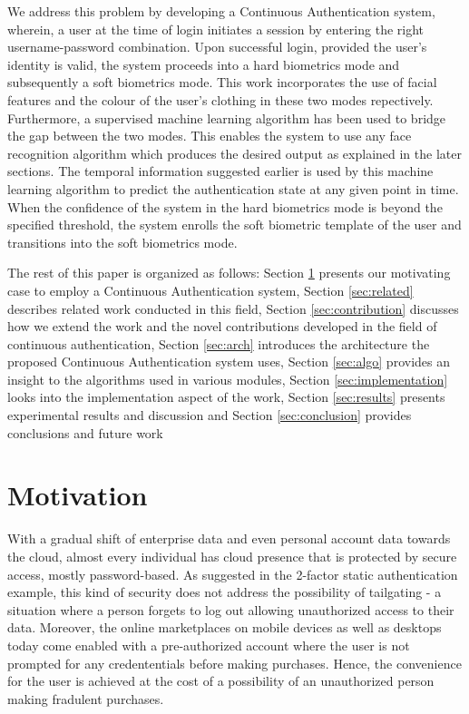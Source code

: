 \documentclass[%
        final,
        internal,
        notitlepage,
        narroweqnarray,
        inline,
        ]{ieee}
\begin{document}
We address this problem by developing a Continuous Authentication system, wherein, a user at the time of login initiates a session by entering the right username-password combination.
Upon successful login, provided the user's identity is valid, the system proceeds into a hard biometrics mode and subsequently a soft biometrics mode.
This work incorporates the use of facial features and the colour of the user's clothing in these two modes repectively. 
Furthermore, a supervised machine learning algorithm has been used to bridge the gap between the two modes.
This enables the system to use any face recognition algorithm which produces the desired output as explained in the later sections.
The temporal information suggested earlier is used by this machine learning algorithm to predict the authentication state at any given point in time.
When the confidence of the system in the hard biometrics mode is beyond the specified threshold, the system enrolls the soft biometric template of the user and transitions into the soft biometrics mode.

The rest of this paper is organized as follows:
Section \ref{sec:motivation} presents our motivating case to employ a Continuous Authentication system,
Section \ref{sec:related} describes related work conducted in this field,
Section \ref{sec:contribution} discusses how we extend the work and the novel contributions developed in the field of continuous authentication,
Section \ref{sec:arch} introduces the architecture the proposed Continuous Authentication system uses,
Section \ref{sec:algo} provides an insight to the algorithms used in various modules,
Section \ref{sec:implementation} looks into the implementation aspect of the work,
Section \ref{sec:results} presents experimental results and discussion and
Section \ref{sec:conclusion} provides conclusions and future work

\section{Motivation} \label{sec:motivation}
With a gradual shift of enterprise data and even personal account data towards the cloud, almost every individual has cloud presence that is protected by secure access, mostly password-based.
As suggested in the 2-factor static authentication example, this kind of security does not address the possibility of tailgating - a situation where a person forgets to log out allowing unauthorized access to their data.
Moreover, the online marketplaces on mobile devices as well as desktops today come enabled with a pre-authorized account where the user is not prompted for any credententials before making purchases.
Hence, the convenience for the user is achieved at the cost of a possibility of an unauthorized person making fradulent purchases.
\end{document}
